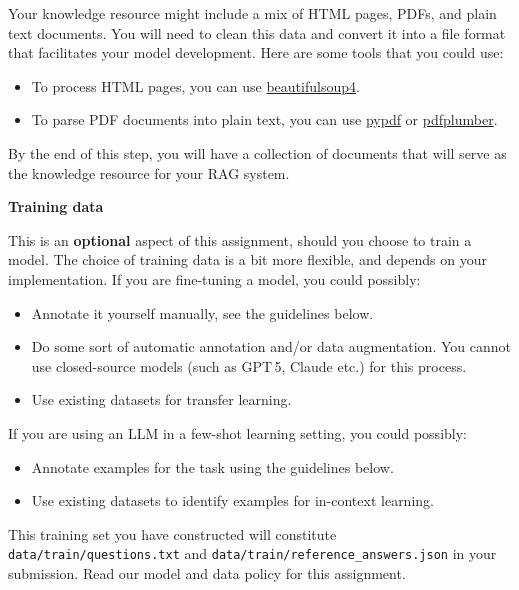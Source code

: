 \documentclass[11pt]{article}
\newcommand{\problem}[1]{%
  \vspace{1em}
  \noindent\colorbox{headerblue}{\parbox{\dimexpr\textwidth-2\fboxsep}{%
    \vspace{2pt}\textbf{\large #1}\vspace{2pt}}}
  \vspace{0.6em}
}
\newcommand{\subsec}[1]{%
  \vspace{0.8em}
  \noindent{\sffamily\bfseries\color{mauve} #1}
  \vspace{0.35em}
  \par
}
\begin{document}
\subsec{Collecting raw data}

\noindent Your knowledge resource might include a mix of HTML pages, PDFs, and plain text documents.
You will need to clean this data and convert it into a file format that facilitates your model
development. Here are some tools that you could use:

\begin{itemize}[nosep, leftmargin=2em]
  \item To process HTML pages, you can use
    \href{https://pypi.org/project/beautifulsoup4/}{beautifulsoup4}.
  \item To parse PDF documents into plain text, you can use
    \href{https://github.com/py-pdf/pypdf}{pypdf} or
    \href{https://github.com/jsvine/pdfplumber}{pdfplumber}.
\end{itemize}

\noindent By the end of this step, you will have a collection of documents that will serve as the
knowledge resource for your RAG system.

\problem{Training data}

\noindent This is an \textbf{optional} aspect of this assignment, should you choose to train a model.
The choice of training data is a bit more flexible, and depends on your implementation. If you are
fine-tuning a model, you could possibly:

\begin{itemize}[nosep, leftmargin=2em]
  \item Annotate it yourself manually, see the guidelines below.
  \item Do some sort of automatic annotation and/or data augmentation. You cannot use closed-source
    models (such as GPT\,5, Claude etc.) for this process.
  \item Use existing datasets for transfer learning.
\end{itemize}

\noindent If you are using an LLM in a few-shot learning setting, you could possibly:

\begin{itemize}[nosep, leftmargin=2em]
  \item Annotate examples for the task using the guidelines below.
  \item Use existing datasets to identify examples for in-context learning.
\end{itemize}

\noindent This training set you have constructed will constitute
\texttt{data/train/questions.txt} and \texttt{data/train/reference\_answers.json} in your submission.
Read our model and data policy for this assignment.
\end{document}
